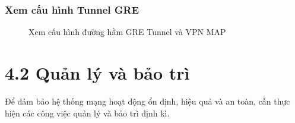 \subsubsection{Xem cấu hình Tunnel GRE}
\begin{figure}[H]
			\hfill
			\hfill
			\caption{Xem cấu hình đường hầm GRE Tunnel và VPN MAP}
			\label{fig:Pic_1117}
\end{figure}

\section*{4.2 Quản lý và bảo trì}
Để đảm bảo hệ thống mạng hoạt động ổn định, hiệu quả và an toàn, cần thực hiện các công việc quản lý và bảo trì định kì.

